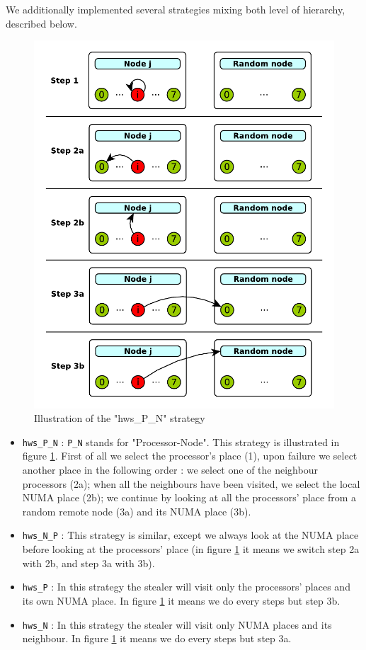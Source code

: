 \documentclass{Styles/llncs}
\begin{document}
We additionally implemented several strategies mixing both level of hierarchy,
described below.

\begin{figure}[t]
  \centering
  \includegraphics[scale=0.7]{figures/strategies.pdf}
\caption{Illustration of the "hws\_P\_N" strategy}
\label{fig:detail-strategy}
\end{figure}
\begin{itemize}
  \item \verb/hws_P_N/ : \verb/P_N/ stands for "Processor-Node". This strategy is
    illustrated in figure \ref{fig:detail-strategy}.
    First of all we select the processor's place (1), upon failure we select
    another place in the following order : we select one of the neighbour
    processors (2a); when all the neighbours have been visited, we select the
    local NUMA place (2b); we continue by looking at all the processors' place
    from a random remote node (3a) and its NUMA place (3b).
  \item \verb/hws_N_P/ : This strategy is similar, except we always look at the
    NUMA place before looking at the processors' place (in figure \ref{fig:detail-strategy}
    it means we switch step 2a with 2b, and step 3a with 3b).
  \item \verb/hws_P/ : In this strategy the stealer will visit only the
    processors' places and its own NUMA place. In figure \ref{fig:detail-strategy} it means we do
    every steps but step 3b.
  \item \verb/hws_N/ : In this strategy the stealer will visit only NUMA places
    and its neighbour. In figure \ref{fig:detail-strategy} it means we do
    every steps but step 3a.
\end{itemize}
\end{document}

